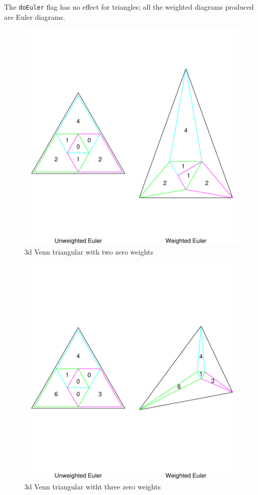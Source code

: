 \documentclass[a4paper]{article}
\begin{document}
The \texttt{doEuler} flag has no effect for triangles; all
the weighted diagrams produced are Euler diagrams.
\begin{figure}[H]\begin{center}
\includegraphics{Vennfig-pv3wempty1t}
\caption{3d Venn triangular with two zero weights}
\end{center}\end{figure}

\begin{figure}[H]\begin{center}
\includegraphics{Vennfig-pv3wempty2t}
\caption{3d Venn triangular witht three zero weights}
\end{center}\end{figure}
\end{document}

